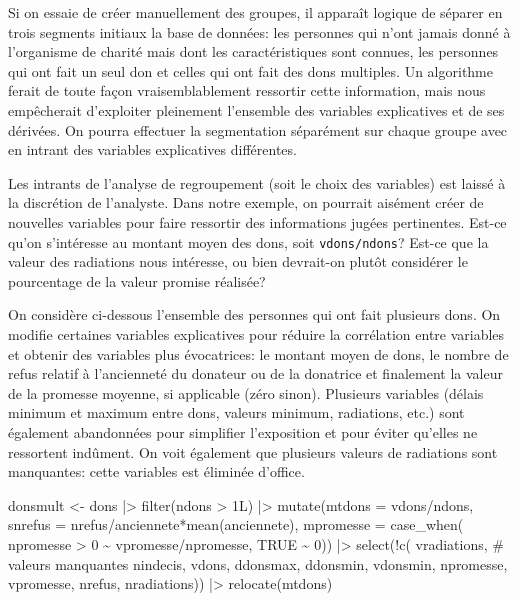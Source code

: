 \documentclass[
  11pt,
  letterpaper,
]{book}
\newenvironment{Shaded}{\begin{snugshade}}{\end{snugshade}}
\newcommand{\AttributeTok}[1]{\textcolor[rgb]{0.40,0.45,0.13}{#1}}
\newcommand{\CommentTok}[1]{\textcolor[rgb]{0.37,0.37,0.37}{#1}}
\newcommand{\ConstantTok}[1]{\textcolor[rgb]{0.56,0.35,0.01}{#1}}
\newcommand{\DecValTok}[1]{\textcolor[rgb]{0.68,0.00,0.00}{#1}}
\newcommand{\FunctionTok}[1]{\textcolor[rgb]{0.28,0.35,0.67}{#1}}
\newcommand{\NormalTok}[1]{\textcolor[rgb]{0.00,0.23,0.31}{#1}}
\newcommand{\OtherTok}[1]{\textcolor[rgb]{0.00,0.23,0.31}{#1}}
\newcommand{\SpecialCharTok}[1]{\textcolor[rgb]{0.37,0.37,0.37}{#1}}
\theoremstyle{definition}
\theoremstyle{remark}
\begin{document}
Si on essaie de créer manuellement des groupes, il apparaît logique de
séparer en trois segments initiaux la base de données: les personnes qui
n'ont jamais donné à l'organisme de charité mais dont les
caractéristiques sont connues, les personnes qui ont fait un seul don et
celles qui ont fait des dons multiples. Un algorithme ferait de toute
façon vraisemblablement ressortir cette information, mais nous
empêcherait d'exploiter pleinement l'ensemble des variables explicatives
et de ses dérivées. On pourra effectuer la segmentation séparément sur
chaque groupe avec en intrant des variables explicatives différentes.

Les intrants de l'analyse de regroupement (soit le choix des variables)
est laissé à la discrétion de l'analyste. Dans notre exemple, on
pourrait aisément créer de nouvelles variables pour faire ressortir des
informations jugées pertinentes. Est-ce qu'on s'intéresse au montant
moyen des dons, soit \texttt{vdons/ndons}? Est-ce que la valeur des
radiations nous intéresse, ou bien devrait-on plutôt considérer le
pourcentage de la valeur promise réalisée?

On considère ci-dessous l'ensemble des personnes qui ont fait plusieurs
dons. On modifie certaines variables explicatives pour réduire la
corrélation entre variables et obtenir des variables plus évocatrices:
le montant moyen de dons, le nombre de refus relatif à l'ancienneté du
donateur ou de la donatrice et finalement la valeur de la promesse
moyenne, si applicable (zéro sinon). Plusieurs variables (délais minimum
et maximum entre dons, valeurs minimum, radiations, etc.) sont également
abandonnées pour simplifier l'exposition et pour éviter qu'elles ne
ressortent indûment. On voit également que plusieurs valeurs de
radiations sont manquantes: cette variables est éliminée d'office.

\begin{Shaded}
\begin{Highlighting}[]
\NormalTok{donsmult }\OtherTok{\textless{}{-}}\NormalTok{ dons }\SpecialCharTok{|\textgreater{}}
  \FunctionTok{filter}\NormalTok{(ndons }\SpecialCharTok{\textgreater{}}\NormalTok{ 1L) }\SpecialCharTok{|\textgreater{}}
  \FunctionTok{mutate}\NormalTok{(}\AttributeTok{mtdons =}\NormalTok{ vdons}\SpecialCharTok{/}\NormalTok{ndons,}
         \AttributeTok{snrefus =}\NormalTok{ nrefus}\SpecialCharTok{/}\NormalTok{anciennete}\SpecialCharTok{*}\FunctionTok{mean}\NormalTok{(anciennete),}
         \AttributeTok{mpromesse =} \FunctionTok{case\_when}\NormalTok{(}
\NormalTok{           npromesse }\SpecialCharTok{\textgreater{}} \DecValTok{0} \SpecialCharTok{\textasciitilde{}}\NormalTok{ vpromesse}\SpecialCharTok{/}\NormalTok{npromesse,}
           \ConstantTok{TRUE} \SpecialCharTok{\textasciitilde{}} \DecValTok{0}\NormalTok{)) }\SpecialCharTok{|\textgreater{}}
  \FunctionTok{select}\NormalTok{(}\SpecialCharTok{!}\FunctionTok{c}\NormalTok{(}
\NormalTok{    vradiations, }\CommentTok{\# valeurs manquantes}
\NormalTok{    nindecis, vdons, ddonsmax,}
\NormalTok{    ddonsmin, vdonsmin, npromesse,}
\NormalTok{    vpromesse, nrefus, nradiations)) }\SpecialCharTok{|\textgreater{}}
  \FunctionTok{relocate}\NormalTok{(mtdons)}
\end{Highlighting}
\end{Shaded}
\end{document}
